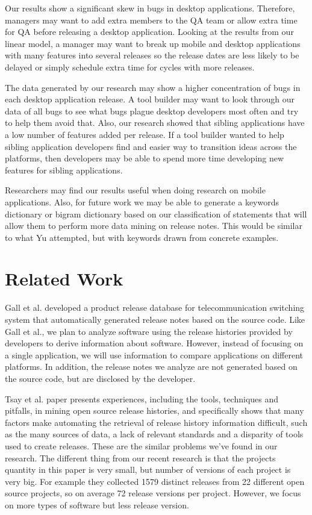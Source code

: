\documentclass{acm_proc_article-sp}
\begin{document}
 Our results show a significant skew in bugs in desktop applications. Therefore, managers may want to add extra members to the QA team or allow extra time for QA before releasing a desktop application. 
Looking at the results from our linear model, a manager may want to break up mobile and desktop applications with many features into several releases so the release dates are less likely to be delayed or simply schedule extra time for cycles with more releases.

 The data generated by our research may show a higher concentration of bugs in each desktop application release. 
A tool builder may want to look through our data of all bugs to see what bugs plague desktop developers most often and try to help them avoid that.
Also, our research showed that sibling applications have a low number of features added per release.
If a tool builder wanted to help sibling application developers find and easier way to transition ideas across the platforms, then developers may be able to spend more time developing new features for sibling applications.

 Researchers may find our results useful when doing research on mobile applications.
Also, for future work we may be able to generate a keywords dictionary or bigram dictionary based on our classification of statements that will allow them to perform more data mining on release notes.
This would be similar to what Yu \cite{YuChangeLogs} attempted, but with keywords drawn from concrete examples.


\section{Related Work}

Gall et al. \cite{GallSoftwareEv} developed a product release database for telecommunication switching system that automatically generated release notes based on the source code.
Like Gall et al., we plan to analyze software using the release histories provided by developers to derive information about software. 
However, instead of focusing on a single application, we will use information to compare applications on different platforms. 
In addition, the release notes we analyze are not generated based on the source code, but are disclosed by the developer.

Tsay et al. \cite{TsayOpenSourceMining} paper presents experiences, including the tools, techniques and pitfalls, in mining open source release histories, and specifically shows that many factors make automating the retrieval of release history information difficult, such as the many sources of data, a lack of relevant standards and a disparity of tools used to create releases. These are the similar problems we've found in our research.
The different thing from our recent research is that the projects quantity in this paper is very small, but number of versions of each project is very big. For example they collected 1579 distinct releases from 22 different open source projects, so on average 72 release versions per project. However, we focus on more types of software but less release version.
\end{document}
